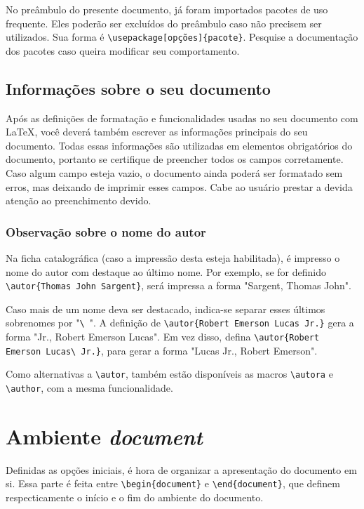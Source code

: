 No preâmbulo do presente documento, já foram importados pacotes de uso frequente. Eles poderão ser excluídos do preâmbulo caso não precisem ser utilizados. Sua forma é \texttt{\textbackslash usepackage[opções]\{pacote\}}. Pesquise a documentação dos pacotes caso queira modificar seu comportamento.

\subsection{Informações sobre o seu documento}
Após as definições de formatação e funcionalidades usadas no seu documento com \LaTeX, você deverá também escrever as informações principais do seu documento. Todas essas informações são utilizadas em elementos obrigatórios do documento, portanto se certifique de preencher todos os campos corretamente. Caso algum campo esteja vazio, o documento ainda poderá ser formatado sem erros, mas deixando de imprimir esses campos. Cabe ao usuário prestar a devida atenção ao preenchimento devido.

\subsubsection{Observação sobre o nome do autor}
Na ficha catalográfica (caso a impressão desta esteja habilitada), é impresso o nome do autor com destaque ao último nome. Por exemplo, se for definido \texttt{\textbackslash autor\{Thomas John Sargent\}}, será impressa a forma "Sargent, Thomas John".

Caso mais de um nome deva ser destacado, indica-se separar esses últimos sobrenomes por "\texttt{\textbackslash\ }". A definição de \texttt{\textbackslash autor\{Robert Emerson Lucas Jr.\}} gera a forma "Jr., Robert Emerson Lucas". Em vez disso, defina \texttt{\textbackslash autor\{Robert Emerson Lucas\textbackslash\ Jr.\}}, para gerar a forma "Lucas Jr., Robert Emerson".

Como alternativas a \texttt{\textbackslash autor}, também estão disponíveis as macros \texttt{\textbackslash autora} e \texttt{\textbackslash author}, com a mesma funcionalidade.

\section{Ambiente \textit{document}}
Definidas as opções iniciais, é hora de organizar a apresentação do documento em si. Essa parte é feita entre \texttt{\textbackslash begin\{document\}} e \texttt{\textbackslash end\{document\}}, que definem respecticamente o início e o fim do ambiente do documento.

